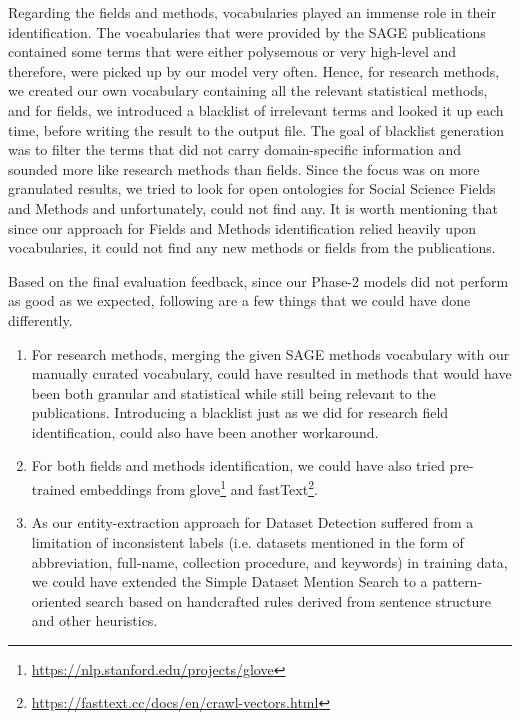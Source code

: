 \documentclass[runningheads]{llncs}
\begin{document}
Regarding the fields and methods, vocabularies played an immense role in their identification. The vocabularies that were provided by the SAGE publications contained some terms that were either polysemous or very high-level and therefore, were picked up by our model very often. Hence, for research methods, we created our own vocabulary containing all the relevant statistical methods, and for fields, we introduced a blacklist of irrelevant terms and looked it up each time, before writing the result to the output file. The goal of blacklist generation was to filter the terms that did not carry domain-specific information and sounded more like research methods than fields. Since the focus was on more granulated results, we tried to look for open ontologies for Social Science Fields and Methods and unfortunately, could not find any. It is worth mentioning that since our approach for Fields and Methods identification relied heavily upon vocabularies, it could not find any new methods or fields from the publications.

Based on the final evaluation feedback, since our Phase-2 models did not perform as good as we expected, following are a few things that we could have done differently.
\begin{enumerate}
    \item For research methods, merging the given SAGE methods vocabulary with our manually curated vocabulary, could have resulted in methods that would have been both granular and statistical while still being relevant to the publications. Introducing a blacklist just as we did for research field identification, could also have been another workaround.
    \item For both fields and methods identification, we could have also tried pre-trained embeddings from glove\footnote{\url{https://nlp.stanford.edu/projects/glove}} and fastText\footnote{\url{https://fasttext.cc/docs/en/crawl-vectors.html}}.
    \item As our entity-extraction approach for Dataset Detection suffered from a limitation of inconsistent labels (i.e. datasets mentioned in the form of abbreviation, full-name, collection procedure, and keywords) in training data, we could have extended the Simple Dataset Mention Search to a pattern-oriented search based on handcrafted rules derived from sentence structure and other heuristics.
\end{enumerate}
\end{document}
